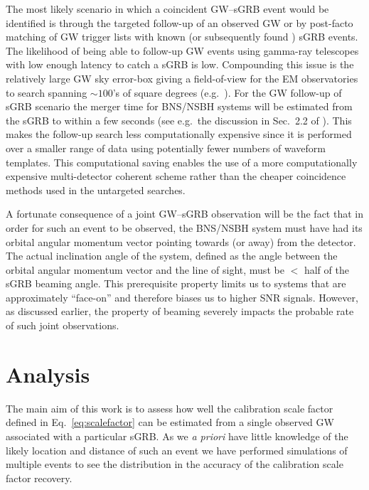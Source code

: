 \documentclass[prd, twocolumn, lengthcheck, superscriptaddress, showpacs, letterpaper, nofootinbib]{revtex4-1}
\begin{document}
The most likely scenario in which a coincident \ac{GW}--\ac{sGRB} event would be identified is 
through the targeted follow-up of an observed \ac{GW} or by post-facto matching of \ac{GW} 
trigger lists with known (or subsequently found \cite{2015ApJS..217....8B}) \ac{sGRB} events.  
The likelihood of being able to follow-up \ac{GW} 
events using gamma-ray telescopes with low enough latency to catch a \ac{sGRB} is low.  Compounding 
this issue is the relatively large \ac{GW} sky error-box giving a field-of-view for the \ac{EM} 
observatories to search spanning $\sim 100$'s of square degrees (e.g.\ 
\cite{2011CQGra..28j5021F,2013arXiv1304.0670L,2014ApJ...795..105S}).  For the \ac{GW} 
follow-up of \ac{sGRB} scenario the merger time for \ac{BNS}/\ac{NSBH} systems will be estimated 
from the \ac{sGRB} to within a few seconds (see e.g.\ the discussion in Sec.\ 2.2 of 
\cite{2012ApJ...760...12A}). This makes the follow-up search less 
computationally expensive since it is performed over a smaller range of data using potentially 
fewer numbers of waveform templates.  This computational saving enables the use of a more 
computationally expensive multi-detector coherent scheme rather than the cheaper coincidence 
methods used in the untargeted searches. 

A fortunate consequence of a joint \ac{GW}--\ac{sGRB} observation will be the fact that in order 
for such an event to be observed, the \ac{BNS}/\ac{NSBH} system must have had its orbital angular 
momentum vector pointing towards (or away) from the detector.  The actual inclination angle of the 
system, defined as the angle between the orbital angular momentum vector and the line of sight, 
must be $<$
half of the \ac{sGRB} beaming angle.  This prerequisite property limits us to systems that are 
approximately ``face-on'' and therefore biases us to higher \ac{SNR} signals.  However, as 
discussed earlier, the property of beaming severely impacts the probable rate of such joint 
observations.   


\section{Analysis}\label{sec:analysis}

The main aim of this work is to assess how well the calibration scale factor
defined in Eq.~\ref{eq:scalefactor} can be estimated from a single observed
\ac{GW} associated with a particular \ac{sGRB}. As we {\it a priori} have
little knowledge of the likely location and distance of such an event we have
performed simulations of multiple events to see the distribution in the accuracy of the calibration 
scale factor recovery.
\end{document}
